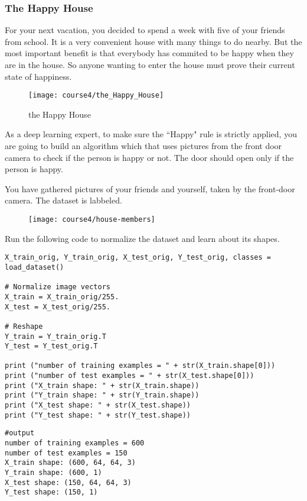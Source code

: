 \subsubsection{The Happy House}

For your next vacation, you decided to spend a week with five of your friends from school. It is a very convenient house with many things to do nearby. But the most important benefit is that everybody has commited to be happy when they are in the house. So anyone wanting to enter the house must prove their current state of happiness.
\begin{figure}[h]
\begin{center}
\texttt{[image: course4/the\_Happy\_House]}
\caption{the Happy House}
\label{the_Happy_House}
\end{center}
\end{figure}

As a deep learning expert, to make sure the ``Happy" rule is strictly applied, you are going to build an algorithm which that uses pictures from the front door camera to check if the person is happy or not. The door should open only if the person is happy.

You have gathered pictures of your friends and yourself, taken by the front-door camera. The dataset is labbeled.
\begin{figure}[h]
\begin{center}
\texttt{[image: course4/house-members]}
\end{center}
\end{figure}

Run the following code to normalize the dataset and learn about its shapes.

\begin{verbatim}
X_train_orig, Y_train_orig, X_test_orig, Y_test_orig, classes = load_dataset()

# Normalize image vectors
X_train = X_train_orig/255.
X_test = X_test_orig/255.

# Reshape
Y_train = Y_train_orig.T
Y_test = Y_test_orig.T

print ("number of training examples = " + str(X_train.shape[0]))
print ("number of test examples = " + str(X_test.shape[0]))
print ("X_train shape: " + str(X_train.shape))
print ("Y_train shape: " + str(Y_train.shape))
print ("X_test shape: " + str(X_test.shape))
print ("Y_test shape: " + str(Y_test.shape))
\end{verbatim}

\begin{verbatim}
#output
number of training examples = 600
number of test examples = 150
X_train shape: (600, 64, 64, 3)
Y_train shape: (600, 1)
X_test shape: (150, 64, 64, 3)
Y_test shape: (150, 1)
\end{verbatim}

